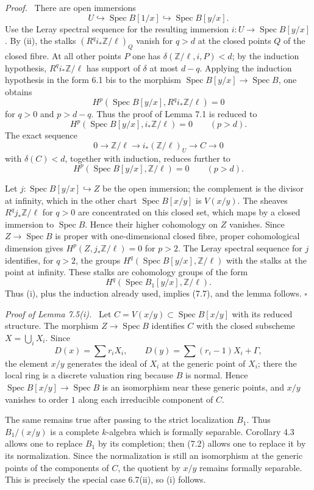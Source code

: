 \documentclass[12pt]{article}
\newcommand{\ZZ}{\mathbb Z}
\DeclareMathOperator{\Spec}{Spec}
\newcommand{\qedtext}{\hfill\(\square\)}
\newenvironment{prooftext}[1][Proof]{\par\noindent\emph{#1.}\ }{\par\medskip}
\begin{document}
\begin{prooftext}
There are open immersions
\[
   U\hookrightarrow\Spec B[1/x]\hookrightarrow\Spec B[y/x].
\]
Use the Leray spectral sequence for the resulting immersion $i:U\to\Spec B[y/x]$. By (ii), the stalks $(R^qi_*\ZZ/\ell)_Q$ vanish for $q>d$ at the closed points $Q$ of the closed fibre. At all other points $P$ one has $\delta(\ZZ/\ell,i,P)<d$; by the induction hypothesis, $R^qi_*\ZZ/\ell$ has support of $\delta$ at most $d-q$. Applying the induction hypothesis in the form 6.1 bis to the morphism $\Spec B[y/x]\to\Spec B$, one obtains
\[
   H^p(\Spec B[y/x],R^qi_*\ZZ/\ell)=0
\]
for $q>0$ and $p>d-q$. Thus the proof of Lemma 7.1 is reduced to
\[
   H^p(\Spec B[y/x],i_*\ZZ/\ell)=0\qquad(p>d).
\]
The exact sequence
\begin{equation}
   0\to \ZZ/\ell\to i_*(\ZZ/\ell)_U\to C\to0 \tag{7.6}
\end{equation}
with $\delta(C)<d$, together with induction, reduces further to
\begin{equation}
   H^p(\Spec B[y/x],\ZZ/\ell)=0\qquad(p>d). \tag{7.7}
\end{equation}

Let $j:\Spec B[y/x]\hookrightarrow Z$ be the open immersion; the complement is the divisor at infinity, which in the other chart $\Spec B[x/y]$ is $V(x/y)$. The sheaves $R^qj_*\ZZ/\ell$ for $q>0$ are concentrated on this closed set, which maps by a closed immersion to $\Spec B$. Hence their higher cohomology on $Z$ vanishes. Since $Z\to\Spec B$ is proper with one-dimensional closed fibre, proper cohomological dimension gives $H^p(Z,j_*\ZZ/\ell)=0$ for $p>2$. The Leray spectral sequence for $j$ identifies, for $q>2$, the groups $H^q(\Spec B[y/x],\ZZ/\ell)$ with the stalks at the point at infinity. These stalks are cohomology groups of the form
\[
   H^q(\Spec B_1[y/x],\ZZ/\ell).
\]
Thus (i), plus the induction already used, implies (7.7), and the lemma follows. \qedtext
\end{prooftext}

\begin{prooftext}[Proof of Lemma 7.5(i)]
Let $C=V(x/y)\subset\Spec B[x/y]$ with its reduced structure. The morphism $Z\to\Spec B$ identifies $C$ with the closed subscheme $X=\bigcup_iX_i$. Since
\[
   D(x)=\sum r_iX_i,
   \qquad D(y)=\sum(r_i-1)X_i+\Gamma,
\]
the element $x/y$ generates the ideal of $X_i$ at the generic point of $X_i$; there the local ring is a discrete valuation ring because $B$ is normal. Hence $\Spec B[x/y]\to\Spec B$ is an isomorphism near these generic points, and $x/y$ vanishes to order $1$ along each irreducible component of $C$.

The same remains true after passing to the strict localization $B_1$. Thus $B_1/(x/y)$ is a complete $k$-algebra which is formally separable. Corollary 4.3 allows one to replace $B_1$ by its completion; then (7.2) allows one to replace it by its normalization. Since the normalization is still an isomorphism at the generic points of the components of $C$, the quotient by $x/y$ remains formally separable. This is precisely the special case 6.7(ii), so (i) follows.
\end{prooftext}
\end{document}
